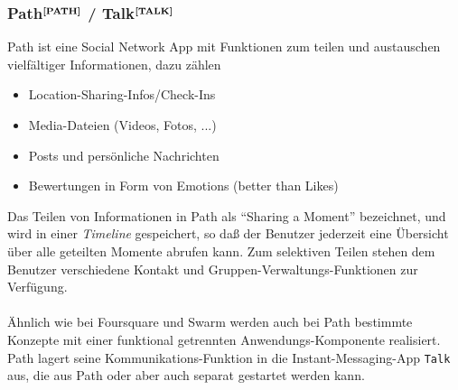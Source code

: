 \subsubsection[Path]{Path$^{\textbf{\ref{PATH}}}$ / Talk$^{\textbf{\ref{TALK}}}$}
\addtocounter{footnote}{1}
\addtocounter{footnote}{1}
Path ist eine Social Network App mit Funktionen zum teilen und austauschen vielfältiger Informationen, dazu zählen
\begin{itemize}[leftmargin=*,noitemsep,topsep=1ex,parsep=0pt,partopsep=0pt]
\item Location-Sharing-Infos/Check-Ins
\item Media-Dateien (Videos, Fotos, ...)
\item Posts und persönliche Nachrichten
\item Bewertungen in Form von Emotions (better than Likes)
\end{itemize}
Das Teilen von Informationen in Path als "`Sharing a Moment"' bezeichnet, und wird in einer \textit{Timeline} gespeichert, so daß der Benutzer jederzeit eine Übersicht über alle geteilten Momente abrufen kann.
Zum selektiven Teilen stehen dem Benutzer verschiedene Kontakt und Gruppen-Verwaltungs-Funktionen zur Verfügung.\\ \\
Ähnlich wie bei Foursquare und Swarm werden auch bei Path bestimmte Konzepte mit einer funktional getrennten Anwendungs-Komponente realisiert. Path lagert seine Kommunikations-Funktion in die Instant-Messaging-App \texttt{Talk} aus, die aus Path oder aber auch separat gestartet werden kann.

